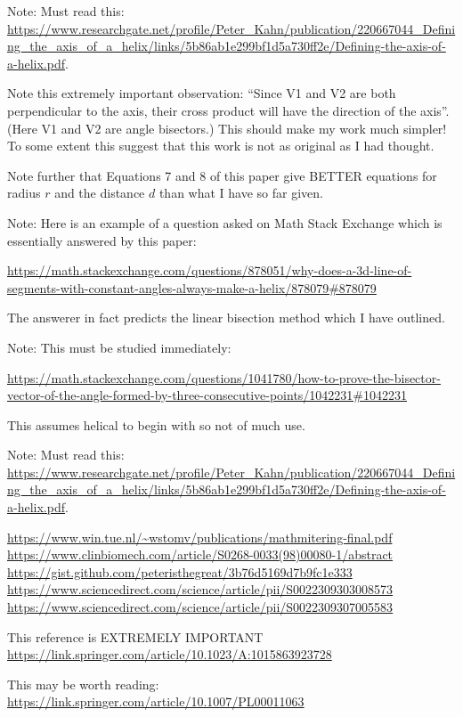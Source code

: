 \documentclass[11pt]{article}
\begin{document}
{Note: Must read this: \url{https://www.researchgate.net/profile/Peter_Kahn/publication/220667044_Defining_the_axis_of_a_helix/links/5b86ab1e299bf1d5a730ff2e/Defining-the-axis-of-a-helix.pdf}\cite{kahn1989defining}.

Note this extremely important observation: ``Since V1 and V2 are both perpendicular to the axis, their cross product will have the direction of the axis''. (Here V1 and V2 are angle bisectors.) This should make my work much simpler!  To some extent this suggest that this work is not as original as I had thought.

Note further that Equations 7 and 8 of this paper give BETTER equations for radius $r$ and the distance $d$ than what I have so far given.


Note: Here is an example of a question asked on Math Stack Exchange which is essentially answered by this paper:

\url{https://math.stackexchange.com/questions/878051/why-does-a-3d-line-of-segments-with-constant-angles-always-make-a-helix/878079#878079}

The answerer in fact predicts the linear bisection method which I have outlined.


Note: This must be studied immediately:

\url{https://math.stackexchange.com/questions/1041780/how-to-prove-the-bisector-vector-of-the-angle-formed-by-three-consecutive-points/1042231#1042231}

This assumes helical to begin with so not of much use.

Note: Must read this: \url{https://www.researchgate.net/profile/Peter_Kahn/publication/220667044_Defining_the_axis_of_a_helix/links/5b86ab1e299bf1d5a730ff2e/Defining-the-axis-of-a-helix.pdf}\cite{kahn1989defining}.



\url{https://www.win.tue.nl/~wstomv/publications/mathmitering-final.pdf}
\url{https://www.clinbiomech.com/article/S0268-0033(98)00080-1/abstract}
\url{https://gist.github.com/peteristhegreat/3b76d5169d7b9fc1e333}
\url{https://www.sciencedirect.com/science/article/pii/S0022309303008573}
\url{https://www.sciencedirect.com/science/article/pii/S0022309307005583}

This reference is EXTREMELY IMPORTANT
\url{https://link.springer.com/article/10.1023/A:1015863923728}



This may be worth reading:
\url{https://link.springer.com/article/10.1007/PL00011063}


}
\end{document}
